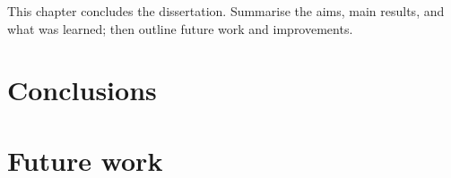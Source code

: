 %

This chapter concludes the dissertation. Summarise the aims, main results, and what was learned; then outline future work and improvements.

\lipsum[35-36]

\section{Conclusions}\label{sec:conclusions}

\lipsum[37-38]

\section{Future work}\label{sec:future}

\lipsum[39-40]
